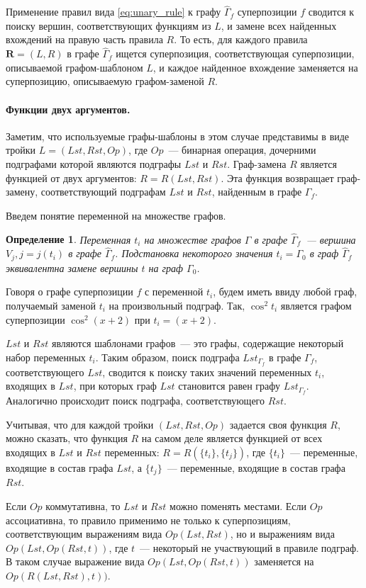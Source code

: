 \documentclass[12pt,a4paper]{article}
\newtheorem{defin}{Определение}
\begin{document}
Применение правил вида \eqref{eq:unary_rule} к графу $\hat{\Gamma}_f$ суперпозиции
$f$ сводится к поиску вершин, соответствующих функциям из $L$,
и замене всех найденных вхождений на правую часть правила $R$. То есть, для
каждого правила $\mathbf{R} = (L, R)$ в графе $\hat{\Gamma}_f$ ищется
суперпозиция, соответствующая суперпозиции, описываемой графом-шаблоном $L$,
и каждое найденное вхождение заменяется на суперпозицию, описываемую
графом-заменой $R$.

\paragraph{Функции двух аргументов.} Заметим, что используемые графы-шаблоны
в этом случае представимы в виде тройки $L = (Lst, Rst, Op)$, где $Op$~--- бинарная операция,
дочерними подграфами которой являются подграфы $Lst$ и $Rst$. Граф-замена $R$
является функцией от двух аргументов: $R = R (Lst, Rst)$. Эта функция возвращает
граф-замену, соответствующий подграфам $Lst$ и $Rst$, найденным в графе $\Gamma_f$.

Введем понятие переменной на множестве графов.
\begin{defin}
  Переменная $t_i$ на множестве графов $\Gamma$ в графе $\hat{\Gamma}_f$~---
  вершина $V_j, j = j(t_i)$ в графе $\hat{\Gamma}_f$. Подстановка некоторого
  значения $t_i = \Gamma_0$ в граф $\hat{\Gamma}_f$ эквивалентна замене вершины
  $t$ на граф $\Gamma_0$.
\end{defin}
Говоря о графе суперпозиции $f$ с переменной $t_i$, будем иметь ввиду любой
граф, получаемый заменой $t_i$ на произвольный подграф. Так, $\cos^2 t_i$
является графом суперпозиции $\cos^2 (x + 2)$ при $t_i = (x + 2)$.

$Lst$ и $Rst$ являются шаблонами графов~--- это графы, содержащие
некоторый набор переменных $t_i$. Таким образом, поиск подграфа $Lst_{\Gamma_f}$
в графе $\Gamma_f$, соответствующего $Lst$, сводится к поиску таких значений
переменных $t_i$, входящих в $Lst$, при которых граф $Lst$ становится равен
графу $Lst_{\Gamma_f}$. Аналогично происходит поиск подграфа, соответствующего
$Rst$.

Учитывая, что для каждой тройки $(Lst, Rst, Op)$ задается своя функция $R$, можно
сказать, что функция $R$ на самом деле является функцией от всех входящих в $Lst$
и $Rst$ переменных: $R = R (\{t_i\}, \{t_j\})$, где $\{t_i\}$~--- переменные,
входящие в состав графа $Lst$, а $\{t_j\}$~--- переменные, входящие в состав
графа $Rst$.

Если $Op$ коммутативна, то $Lst$ и $Rst$ можно поменять местами. Если $Op$ ассоциативна,
то правило применимо не только к суперпозициям, соответствующим выражениям вида
$Op (Lst, Rst)$, но и выражениям вида $Op (Lst, Op (Rst, t))$, где $t$~--- некоторый
не участвующий в правиле подграф. В таком случае выражение вида $Op (Lst, Op (Rst, t))$
заменяется на $Op (R (Lst, Rst), t))$.
\end{document}
